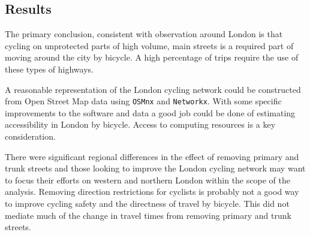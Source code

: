 

%


\subsection{Results}	

The primary conclusion, consistent with observation around London is that cycling on unprotected parts of high volume, main streets is a required part of moving around the city by bicycle. A high percentage of trips require the use of these types of highways. 

A reasonable representation of the London cycling network could be constructed from Open Street Map data using \texttt{OSMnx} and \texttt{Networkx}. With some specific improvements to the software and data a good job could be done of estimating accessibility in London by bicycle. Access to computing resources is a key consideration.

There were significant regional differences in the effect of removing primary and trunk streets and those looking to improve the London cycling network may want to focus their efforts on western and northern London within the scope of the analysis. Removing direction restrictions for cyclists is probably not a good way to improve cycling safety and the directness of travel by bicycle. This did not mediate much of the change in travel times from removing primary and trunk streets. 

